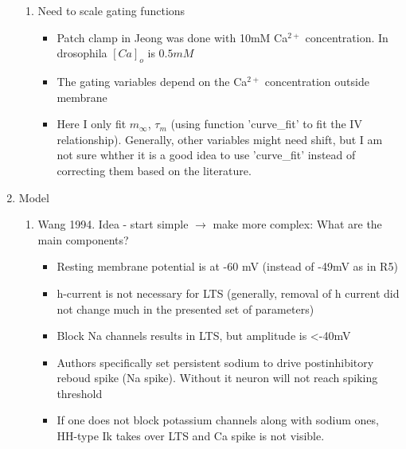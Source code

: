 \documentclass[11pt]{article}
\begin{document}
\begin{enumerate}
\begin{enumerate}
        \item Need to scale gating functions
        \begin{itemize}
            \item Patch clamp in Jeong was done with 10mM Ca$^{2+}$ concentration. In drosophila
            $[Ca]_{o}$ is $0.5mM$
            \item The gating variables depend on the Ca$^{2+}$ concentration outside membrane
            \item Here I only fit $m_\infty$, $\tau_m$ (using function 'curve\_fit' to fit the
            IV relationship). Generally, other variables might need shift, but I am not sure whther
            it is a good idea to use 'curve\_fit' instead of correcting them based on the
            literature.
        \end{itemize}
    \end{enumerate}


    \item Model
    \begin{enumerate}
        \item Wang 1994. Idea - start simple $\rightarrow$ make more complex: What are the main components?
        \begin{itemize}
            \item Resting membrane potential is at -60 mV (instead of -49mV as in R5)
            \item h-current is not necessary for LTS (generally, removal of h current
            did not change much in the presented set of parameters)
            \item Block Na channels results in LTS, but amplitude is <-40mV
            \item Authors specifically set persistent sodium to drive postinhibitory reboud
            spike (Na spike). Without it neuron will not reach spiking threshold
            \item If one does not block potassium channels along with sodium ones, HH-type Ik takes over
            LTS and Ca spike is not visible.
        \end{itemize}
    \end{enumerate}

\end{enumerate}
\end{document}
